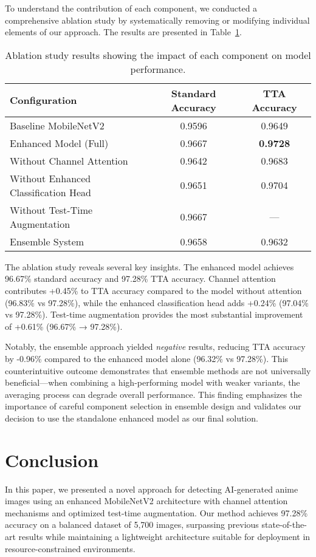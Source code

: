 \documentclass{article}
\begin{document}
To understand the contribution of each component, we conducted a comprehensive ablation study by systematically removing or modifying individual elements of our approach. The results are presented in Table~\ref{tab:ablation_study}.

\begin{table}[H]
\centering
\caption{Ablation study results showing the impact of each component on model performance.}
\label{tab:ablation_study}
\begin{tabular}{lcc}
\hline
\textbf{Configuration} & \textbf{Standard Accuracy} & \textbf{TTA Accuracy} \\
\hline
Baseline MobileNetV2 & 0.9596 & 0.9649 \\
Enhanced Model (Full) & 0.9667 & \textbf{0.9728} \\
Without Channel Attention & 0.9642 & 0.9683 \\
Without Enhanced Classification Head & 0.9651 & 0.9704 \\
Without Test-Time Augmentation & 0.9667 & --- \\
Ensemble System & 0.9658 & 0.9632 \\
\hline
\end{tabular}
\end{table}

The ablation study reveals several key insights. The enhanced model achieves 96.67\% standard accuracy and 97.28\% TTA accuracy. Channel attention contributes +0.45\% to TTA accuracy compared to the model without attention (96.83\% vs 97.28\%), while the enhanced classification head adds +0.24\% (97.04\% vs 97.28\%). Test-time augmentation provides the most substantial improvement of +0.61\% (96.67\% → 97.28\%).

Notably, the ensemble approach yielded \textit{negative} results, reducing TTA accuracy by -0.96\% compared to the enhanced model alone (96.32\% vs 97.28\%). This counterintuitive outcome demonstrates that ensemble methods are not universally beneficial—when combining a high-performing model with weaker variants, the averaging process can degrade overall performance. This finding emphasizes the importance of careful component selection in ensemble design and validates our decision to use the standalone enhanced model as our final solution.

\section{Conclusion}

In this paper, we presented a novel approach for detecting AI-generated anime images using an enhanced MobileNetV2 architecture with channel attention mechanisms and optimized test-time augmentation. Our method achieves 97.28\% accuracy on a balanced dataset of 5,700 images, surpassing previous state-of-the-art results while maintaining a lightweight architecture suitable for deployment in resource-constrained environments.
\end{document}
